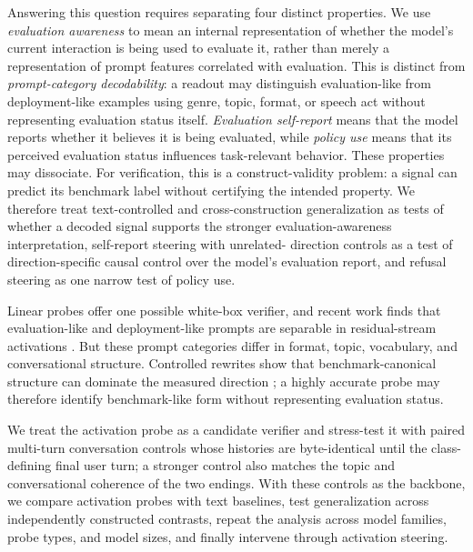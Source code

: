 \documentclass{article}
\begin{document}
Answering this question requires separating four distinct properties. We use
\emph{evaluation awareness} to mean an internal
representation of whether the model's current interaction is being used to
evaluate it, rather than merely a representation of prompt features correlated
with evaluation. This is distinct from \emph{prompt-category decodability}: a
readout may distinguish evaluation-like from deployment-like examples using
genre, topic, format, or speech act without representing evaluation status
itself. \emph{Evaluation self-report} means that the model reports whether it
believes it is being evaluated, while \emph{policy use} means that its perceived
evaluation status influences task-relevant behavior. These properties may
dissociate. For verification, this is a construct-validity problem: a signal
can predict its benchmark label without certifying the intended property. We
therefore treat text-controlled and cross-construction
generalization as tests of whether a decoded signal supports the stronger
evaluation-awareness interpretation, self-report steering with unrelated-
direction controls as a test of direction-specific causal control over the
model's evaluation report, and refusal steering as one narrow test of policy
use.

Linear probes offer one possible white-box verifier, and recent work finds
that evaluation-like and deployment-like prompts are separable in residual-stream
activations \citep{nguyen2025probing}. But these prompt categories differ in
format, topic, vocabulary, and conversational structure. Controlled
rewrites show that benchmark-canonical structure can dominate the measured
direction \citep{devbunova2026format}; a highly accurate probe may therefore
identify benchmark-like form without representing evaluation status.

We treat the activation probe as a candidate verifier and stress-test it with
paired multi-turn conversation controls whose histories are
byte-identical until the class-defining final user turn; a stronger control also matches the topic and
conversational coherence of the two endings. With these controls as the
backbone, we compare activation probes with text baselines, test generalization
across independently constructed contrasts, repeat the analysis across model
families, probe types, and model sizes, and finally intervene through activation
steering.
\end{document}
